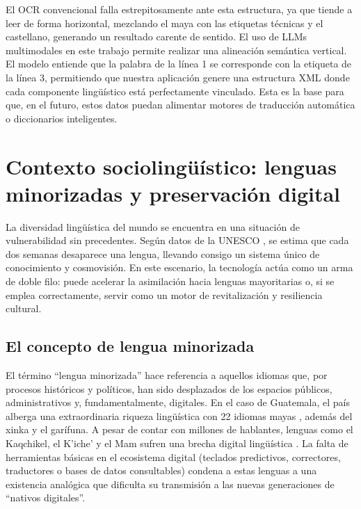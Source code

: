 El OCR convencional falla estrepitosamente ante esta estructura, ya que tiende a leer de forma horizontal, mezclando el maya con las etiquetas técnicas y el castellano, generando un resultado carente de sentido.
El uso de LLMs multimodales en este trabajo permite realizar una alineación semántica vertical. El modelo entiende que la palabra de la línea 1 se corresponde con la etiqueta de la línea 3, permitiendo que nuestra aplicación genere una estructura XML donde cada componente lingüístico está perfectamente vinculado. Esta es la base para que, en el futuro, estos datos puedan alimentar motores de traducción automática o diccionarios inteligentes.

\section{Contexto sociolingüístico: lenguas minorizadas y preservación digital}

La diversidad lingüística del mundo se encuentra en una situación de vulnerabilidad sin precedentes. Según datos de la UNESCO \parencite{unesco2025languages}, se estima que cada dos semanas desaparece una lengua, llevando consigo un sistema único de conocimiento y cosmovisión. En este escenario, la tecnología actúa como un arma de doble filo: puede acelerar la asimilación hacia lenguas mayoritarias o, si se emplea correctamente, servir como un motor de revitalización y resiliencia cultural.

\subsection{El concepto de lengua minorizada}

El término ``lengua minorizada'' hace referencia a aquellos idiomas que, por procesos históricos y políticos, han sido desplazados de los espacios públicos, administrativos y, fundamentalmente, digitales. En el caso de Guatemala, el país alberga una extraordinaria riqueza lingüística con 22 idiomas mayas \parencite{ajb1997tension}, además del xinka y el garífuna. A pesar de contar con millones de hablantes, lenguas como el Kaqchikel, el K'iche' y el Mam sufren una brecha digital lingüística \parencite{gomez2021pueblos}. La falta de herramientas básicas en el ecosistema digital (teclados predictivos, correctores, traductores o bases de datos consultables) condena a estas lenguas a una existencia analógica que dificulta su transmisión a las nuevas generaciones de ``nativos digitales''.

